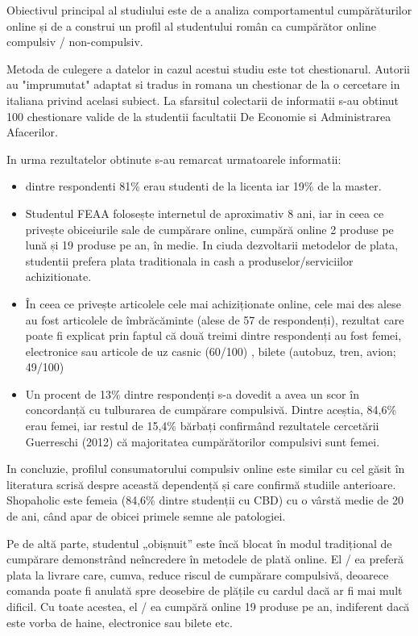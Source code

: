 \documentclass[a4paper, 12pt]{article}
\begin{document}
	\quad Obiectivul principal al studiului este de a analiza comportamentul cumpărăturilor online și de a construi un profil al studentului român ca cumpărător online compulsiv / non-compulsiv.
	
	\quad Metoda de culegere a datelor in cazul acestui studiu este tot chestionarul. Autorii au "imprumutat" adaptat si tradus in romana un chestionar de la o cercetare in italiana privind acelasi subiect. La sfarsitul colectarii de informatii s-au obtinut 100 chestionare valide de la studentii facultatii De Economie si Administrarea Afacerilor. 
	
	\qquad In urma rezultatelor obtinute s-au remarcat urmatoarele informatii: 
		\begin{itemize}
	\item dintre respondenti 81\% erau studenti de la licenta iar 19\% de la master. 
	\item Studentul FEAA folosește internetul de aproximativ 8 ani, iar in ceea ce privește obiceiurile sale de cumpărare online, cumpără online 2 produse pe lună și 19 produse pe an, în medie. In ciuda dezvoltarii metodelor de plata, studentii prefera plata traditionala in cash a produselor/serviciilor achizitionate.
	 \item În ceea ce privește articolele cele mai achiziționate online, cele mai des alese au fost articolele de îmbrăcăminte (alese de 57 de respondenți), rezultat care poate fi explicat prin faptul că două treimi dintre respondenți au fost femei, electronice sau articole de uz casnic (60/100) , bilete (autobuz, tren, avion; 49/100)
	\item Un procent de 13\% dintre respondenți s-a dovedit a avea un scor în concordanță cu tulburarea de cumpărare compulsivă. Dintre aceștia, 84,6\% erau femei, iar restul de 15,4\% bărbați confirmând rezultatele cercetării Guerreschi (2012) că majoritatea cumpărătorilor compulsivi sunt femei.
\end{itemize}
		\qquad In concluzie, profilul consumatorului compulsiv online este similar cu cel găsit în literatura scrisă despre această dependență și care confirmă studiile anterioare. Shopaholic este femeia (84,6\% dintre studenții cu CBD) cu o vârstă medie de 20 de ani, când apar de obicei primele semne ale patologiei.
		
		\quad Pe de altă parte, studentul „obișnuit” este încă blocat în modul tradițional de cumpărare demonstrând neîncredere în metodele de plată online. El / ea preferă plata la livrare care, cumva,  reduce riscul de cumpărare compulsivă, deoarece comanda poate fi anulată spre deosebire de plățile cu cardul dacă ar fi mai mult dificil. Cu toate acestea, el / ea cumpără online 19 produse pe an, indiferent dacă este vorba de haine, electronice sau bilete etc.
\end{document}
